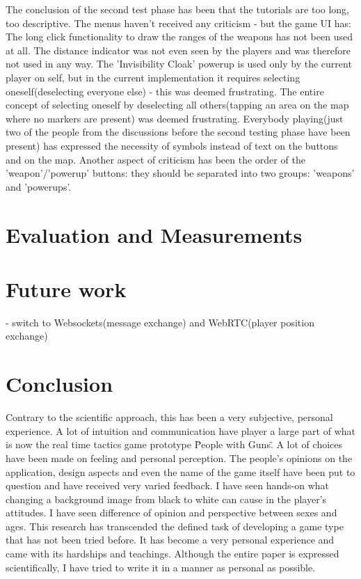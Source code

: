 \documentclass{article}
\begin{document}
The conclusion of the second test phase has been that the tutorials are too
long, too descriptive. The menus haven't received any criticism - but the game
UI has: The long click functionality to draw the ranges of the weapons has not
been used at all. The distance indicator was not even seen by the players and
was therefore not used in any way. The 'Invisibility Cloak' powerup is used only
by the current player on self, but in the current implementation it requires
selecting oneself(deselecting everyone else) - this was deemed frustrating. The
entire concept of selecting oneself by deselecting all others(tapping an area
on the map where no markers are present) was deemed frustrating. Everybody
playing(just two of the people from the discussions before the second testing
phase have been present) has expressed the necessity of symbols instead of text
on the buttons and on the map. Another aspect of criticism has been the order of
the 'weapon'/'powerup' buttons: they should be separated into two groups:
'weapons' and 'powerups'.\newline



\section{Evaluation and Measurements}



\section{Future work}

- switch to Websockets(message exchange) and WebRTC(player position exchange)


\section{Conclusion}

Contrary to the scientific approach, this has been a very subjective, personal
experience. A lot of intuition and communication have player a large part of
what is now the real time tactics game prototype \"People with Guns\". A lot of
choices have been made on feeling and personal perception. The people's opinions
on the application, design aspects and even the name of the game itself have
been put to question and have received very varied feedback. I have seen
hands-on what changing a background image from black to white can cause in the
player's attitudes. I have seen difference of opinion and perspective between
sexes and ages. This research has transcended the defined task of developing a
game type that has not been tried before. It has become a very personal
experience and came with its hardships and teachings. Although the entire paper
is expressed scientifically, I have tried to write it in a manner as personal as
possible.\newline
\end{document}

